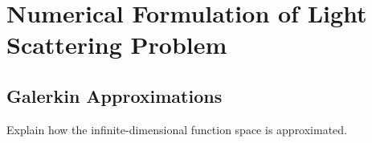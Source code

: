 \chapter{Numerical Formulation of Light Scattering Problem}
\label{chap:num_formulation}

\section{Galerkin Approximations}
Explain how the infinite-dimensional function space is approximated.